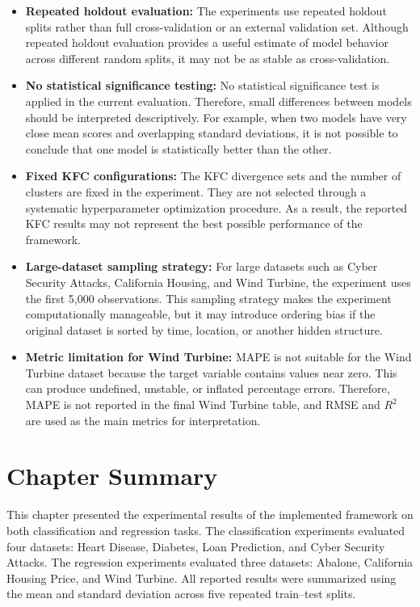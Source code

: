 \begin{itemize}
\item \textbf{Repeated holdout evaluation:} The experiments use repeated holdout splits rather than full cross-validation or an external validation set. Although repeated holdout evaluation provides a useful estimate of model behavior across different random splits, it may not be as stable as cross-validation.

\item \textbf{No statistical significance testing:} No statistical significance test is applied in the current evaluation. Therefore, small differences between models should be interpreted descriptively. For example, when two models have very close mean scores and overlapping standard deviations, it is not possible to conclude that one model is statistically better than the other.

\item \textbf{Fixed KFC configurations:} The KFC divergence sets and the number of clusters are fixed in the experiment. They are not selected through a systematic hyperparameter optimization procedure. As a result, the reported KFC results may not represent the best possible performance of the framework.

\item \textbf{Large-dataset sampling strategy:} For large datasets such as Cyber Security Attacks, California Housing, and Wind Turbine, the experiment uses the first 5,000 observations. This sampling strategy makes the experiment computationally manageable, but it may introduce ordering bias if the original dataset is sorted by time, location, or another hidden structure.


\item \textbf{Metric limitation for Wind Turbine:} MAPE is not suitable for the Wind Turbine dataset because the target variable contains values near zero. This can produce undefined, unstable, or inflated percentage errors. Therefore, MAPE is not reported in the final Wind Turbine table, and RMSE and $R^2$ are used as the main metrics for interpretation.
\end{itemize}




\section{Chapter Summary}
\label{sec:chapter_summary_results}

\hs This chapter presented the experimental results of the implemented framework on both classification and regression tasks. The classification experiments evaluated four datasets: Heart Disease, Diabetes, Loan Prediction, and Cyber Security Attacks. The regression experiments evaluated three datasets: Abalone, California Housing Price, and Wind Turbine. All reported results were summarized using the mean and standard deviation across five repeated train--test splits.





